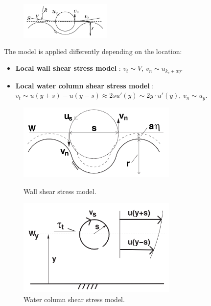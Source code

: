 \documentclass[10pt]{article}
\begin{document}
\begin{figure}[ht!]
    \centering
    \includegraphics[width=0.4\textwidth]{./figures/eddies.png}
    \label{fig:-figures-eddies-png}
\end{figure}

The model is applied differently depending on the location:
\begin{itemize}
    \item \textbf{Local wall shear stress model} \cite{gioiaFriction2006}: $v_t \sim V$, $v_n\sim u_{k_s+a\eta}$.
    \item \textbf{Local water column shear stress model} \cite{gioiaMVP2010}: $v_t\sim u(y+s) - u(y-s)\approx 2s u'(y) \sim 2y\cdot u'(y)$, $v_n \sim u_y$.
\end{itemize}

\begin{figure}[!htb]
    \centering
    \begin{minipage}{.5\textwidth}
        \centering
        \includegraphics[width=0.7\textwidth]{./figures/wall-shear.png}
        \caption{Wall shear stress model.}
        \label{fig:wall-shear}
    \end{minipage}%
    \begin{minipage}{0.5\textwidth}
        \centering
        \includegraphics[width=0.7\textwidth]{./figures/column-shear.png}
        \caption{Water column shear stress model.}
        \label{fig:column-shear}
    \end{minipage}
\end{figure}
\end{document}
